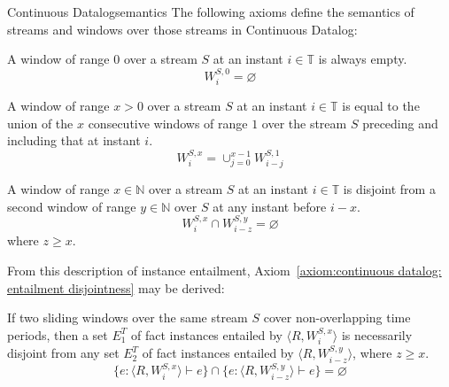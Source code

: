 \begin{nestedsection}{Continuous Datalog}{semantics}
The following axioms define the semantics of streams and windows over
those streams in Continuous Datalog:

\begin{axiom}\label{axiom:continuous datalog: window range leq 0}
A window of range $0$ over a stream $S$ at an instant 
${i \in \mathbb{T}}$ is always empty.
\begin{equation*}
W^{S,0}_{i} = \varnothing
\end{equation*}
\end{axiom}

\begin{axiom}\label{axiom:continuous datalog: window composition}
A window of range ${x > 0}$ over a stream $S$ at an instant 
${i \in \mathbb{T}}$ is equal to the union of the $x$ consecutive
windows of range $1$ over the stream $S$ preceding and including that at
instant $i$.
\begin{equation*}
W^{S,x}_{i} = \mathop{\cup}_{j=0}^{x-1} W^{S,1}_{i-j}
\end{equation*}
\end{axiom}

\begin{axiom}\label{axiom:continuous datalog: window disjointness}
A window of range ${x \in \mathbb{N}}$ over a stream $S$ at an
instant ${i \in \mathbb{T}}$ is disjoint from a second window of 
range ${y \in \mathbb{N}}$ over $S$ at any instant before $i - x$.
\begin{equation*}
W^{S,x}_{i} \cap W^{S,y}_{i-z} = \varnothing
\end{equation*}
where $z \geq x$.
\end{axiom}


From this description of instance entailment,
Axiom~\ref{axiom:continuous datalog: entailment disjointness} may be
derived:
\begin{axiom}\label{axiom:continuous datalog: entailment disjointness}
  If two sliding windows over the same stream $S$ cover non-overlapping time periods,
then a set $E^T_1$ of fact instances entailed by ${\langle R, W^{S,x}_i \rangle}$
is necessarily disjoint from any set $E^T_2$ of fact instances entailed by
$\langle R, W^{S,y}_{i-z} \rangle$, where ${z \geq x}$.
\[ \{ e : \langle R , W^{S,x}_i \rangle \vdash e \} \cap \{ e : \langle R , W^{S,y}_{i-z} \rangle \vdash e \} = \varnothing \]
\end{axiom}


\end{nestedsection}
